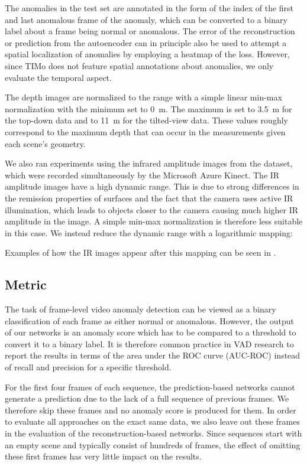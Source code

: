 \documentclass[10pt,twocolumn,letterpaper]{article}
\begin{document}
The anomalies in the test set are annotated in the form of the index of the first and last anomalous frame of the anomaly, which can be converted to a binary label about a frame being normal or anomalous. The error of the reconstruction or prediction from the autoencoder can in principle also be used to attempt a spatial localization of anomalies by employing a heatmap of the loss. However, since TIMo does not feature spatial annotations about anomalies, we only evaluate the temporal aspect.

The depth images are normalized to the  range with a simple linear min-max normalization with the minimum set to \SI{0}{\meter}. The maximum is set to \SI{3.5}{\meter} for the top-down data and to \SI{11}{\meter} for the tilted-view data. These values roughly correspond to the maximum depth that can occur in the measurements given each scene's geometry.

We also ran experiments using the infrared amplitude images from the dataset, which were recorded simultaneously by the Microsoft Azure Kinect. The IR amplitude images have a high dynamic range. This is due to strong differences in the remission properties of surfaces and the fact that the camera uses active IR illumination, which leads to objects closer to the camera causing much higher IR amplitude in the image. A simple min-max normalization is therefore less suitable in this case. We instead reduce the dynamic range with a logarithmic mapping:

Examples of how the IR images appear after this mapping can be seen in .

\subsection{Metric}
The task of frame-level video anomaly detection can be viewed as a binary classification of each frame as either normal or anomalous. However, the output of our networks is an anomaly score which has to be compared to a threshold to convert it to a binary label. It is therefore common practice in VAD research to report the results in terms of the area under the ROC curve (AUC-ROC) instead of recall and precision for a specific threshold. 

For the first four frames of each sequence, the prediction-based networks cannot generate a prediction due to the lack of a full sequence of previous frames. We therefore skip these frames and no anomaly score is produced for them. In order to evaluate all approaches on the exact same data, we also leave out these frames in the evaluation of the reconstruction-based networks. Since sequences start with an empty scene and typically consist of hundreds of frames, the effect of omitting these first frames has very little impact on the results.
\end{document}
